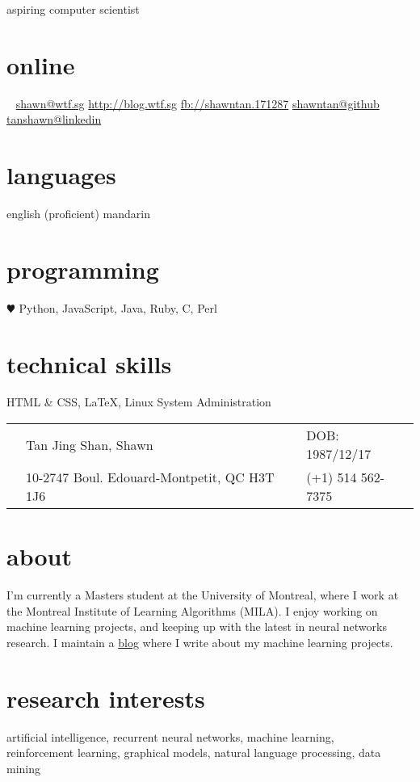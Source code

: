 \documentclass[]{friggeri-cv}
\begin{document}
{aspiring computer scientist

}

\begin{aside}
	\section{online}
	\Email~ \href{mailto:shawn@wtf.sg}{shawn@wtf.sg}
	\href{https://blog.wtf.sg}{http://blog.wtf.sg}
	\href{http://facebook.com/shawntan.171287}{fb://shawntan.171287}
	\href{http://github.com/shawntan}{shawntan@github}
	\href{http://sg.linkedin.com/in/tanshawn}{tanshawn@linkedin}
	\section{languages}
	english (proficient)
	mandarin
	\section{programming}
	{\color{red} $\varheartsuit$} Python, JavaScript, Java, Ruby, C, Perl
	\section{technical skills}
	HTML \& CSS, \LaTeX,
	Linux System Administration
\end{aside}
\begin{tabular}{ p{0.45cm} p{8cm} p{0.45cm} p{6.5cm} }
	\Male 	& Tan Jing Shan, Shawn	 & \Sagittarius &  DOB: 1987/12/17\\
	\Letter & 10-2747 Boul. Edouard-Montpetit, QC H3T 1J6 & \Mobilefone & (+1) 
	514 562-7375\\
\end{tabular}


\section{about}
I'm currently a Masters student at the University of Montreal, where I work at 
the Montreal Institute of Learning Algorithms (MILA). I enjoy working on machine 
learning projects, and keeping up with the latest in neural networks research. I 
maintain a \href{http://blog.wtf.sg}{blog} where I write about my machine 
learning projects.


\section{research interests}
artificial intelligence, recurrent neural networks, machine learning,\\
reinforcement learning, graphical models, natural language processing, data 
mining
\end{document}
